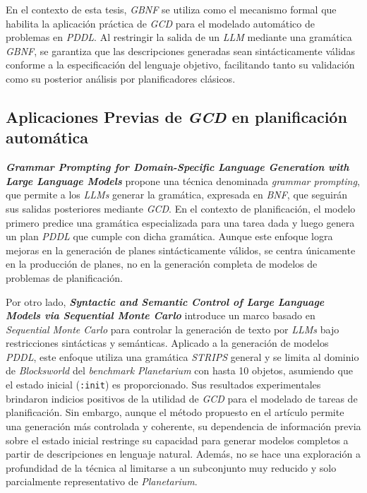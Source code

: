 En el contexto de esta tesis, \textit{GBNF} se utiliza como el mecanismo formal que habilita la aplicación práctica de \textit{GCD} para el modelado automático de problemas en \textit{PDDL}. Al restringir la salida de un \textit{LLM} mediante una gramática \textit{GBNF}, se garantiza que las descripciones generadas sean sintácticamente válidas conforme a la especificación del lenguaje objetivo, facilitando tanto su validación como su posterior análisis por planificadores clásicos.

\subsection{Aplicaciones Previas de \textit{GCD} en planificación automática}

\textbf{\textit{Grammar Prompting for Domain-Specific Language Generation with Large Language Models}} \parencite{wang2023grammar} propone una técnica denominada \textit{grammar prompting}, que permite a los \textit{LLMs} generar la gramática, expresada en \textit{BNF}, que seguirán sus salidas posteriores mediante \textit{GCD}. En el contexto de planificación, el modelo primero predice una gramática especializada para una tarea dada y luego genera un plan \textit{PDDL} que cumple con dicha gramática. Aunque este enfoque logra mejoras en la generación de planes sintácticamente válidos, se centra únicamente en la producción de planes, no en la generación completa de modelos de problemas de planificación.

Por otro lado, \textbf{\textit{Syntactic and Semantic Control of Large Language Models via Sequential Monte Carlo}} \parencite{loula2025syntactic} introduce un marco basado en \textit{Sequential Monte Carlo} para controlar la generación de texto por \textit{LLMs} bajo restricciones sintácticas y semánticas. Aplicado a la generación de modelos \textit{PDDL}, este enfoque utiliza una gramática \textit{STRIPS} general y se limita al dominio de \textit{Blocksworld} del \textit{benchmark Planetarium} con hasta 10 objetos, asumiendo que el estado inicial (\texttt{:init}) es proporcionado. Sus resultados experimentales brindaron indicios positivos de la utilidad de \textit{GCD} para el modelado de tareas de planificación. Sin embargo, aunque el método propuesto en el artículo permite una generación más controlada y coherente, su dependencia de información previa sobre el estado inicial restringe su capacidad para generar modelos completos a partir de descripciones en lenguaje natural. Además, no se hace una exploración a profundidad de la técnica al limitarse a un subconjunto muy reducido y solo parcialmente representativo de \textit{Planetarium}.

